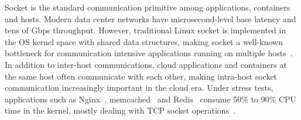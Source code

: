 Socket is the standard communication primitive among applications, containers and hosts.
Modern data center networks have microsecond-level base latency and tens of Gbps throughput. However, traditional Linux socket is implemented in the OS kernel space with shared data structures, making socket a well-known bottleneck for communication intensive applications running on multiple hosts~\cite{barroso2017attack}. In addition to inter-host communications, cloud applications and containers at the same host often communicate with each other, making intra-host socket communication increasingly important in the cloud era. Under stress tests, applications such as Nginx~\cite{reese2008nginx}, memcached~\cite{fitzpatrick2004distributed} and Redis~\cite{carlson2013redis} consume 50\% to 90\% CPU time in the kernel, mostly dealing with TCP socket operations~\cite{jeong2014mtcp}.

\iffalse
TCP socket in a modern OS typically has three functions:
\begin{ecompact}
	\item Address, locate and connect to another application; %
	\item Provide a reliable and ordered communication channel, identified by an integer \emph{file descriptor} (FD);
	\item Multiplex events from multiple channels， e.g., poll and epoll. Most Linux applications use a readiness-driven I/O multiplexing model. The OS tells application which FDs are ready to receive or send, then the application may prepare buffers and issue receive or send operations.
\end{ecompact}
\fi

